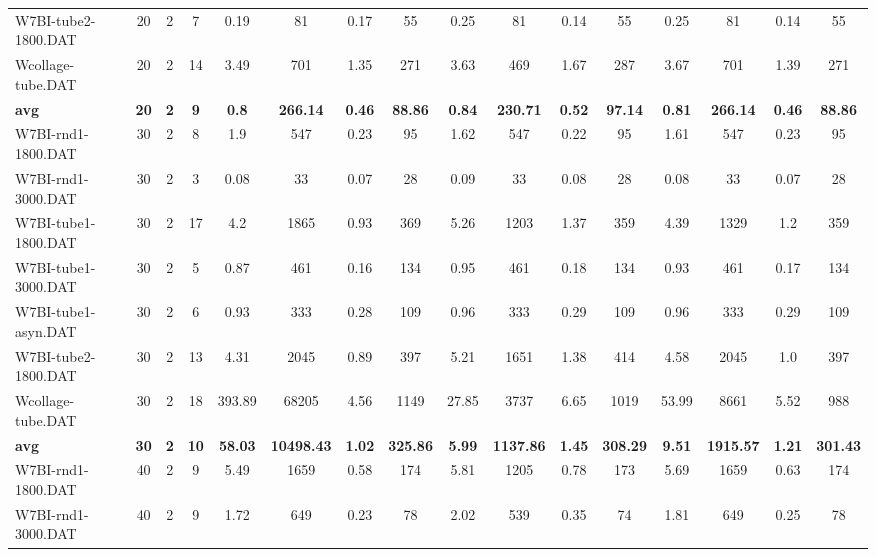 \begin{sidewaystable}[!ht]
{\begin{tabular}{lccccccccccccccc}
W7BI-tube2-1800.DAT & 20 & 2 & 7 & 0.19 & 81 & 0.17 & 55 & 0.25 & 81 &  \textcolor{blue2}{0.14} & 55 & 0.25 & 81 &  \textcolor{blue2}{0.14} & 55 \\
Wcollage-tube.DAT & 20 & 2 & 14 & 3.49 & 701 &  \textcolor{blue2}{1.35} & 271 & 3.63 & 469 & 1.67 & 287 & 3.67 & 701 & 1.39 & 271 \\
\cline{1-16} \textbf{avg} & \textbf{20} & \textbf{2} & \textbf{9} & \textbf{0.8} & \textbf{266.14} & \textbf{0.46} & \textbf{88.86} & \textbf{0.84} & \textbf{230.71} & \textbf{0.52} & \textbf{97.14} & \textbf{0.81} & \textbf{266.14} & \textbf{0.46} & \textbf{88.86} \\ \cline{1-16}
W7BI-rnd1-1800.DAT & 30 & 2 & 8 & 1.9 & 547 & 0.23 & 95 & 1.62 & 547 &  \textcolor{blue2}{0.22} & 95 & 1.61 & 547 & 0.23 & 95 \\
W7BI-rnd1-3000.DAT & 30 & 2 & 3 & 0.08 & 33 &  \textcolor{blue2}{0.07} & 28 & 0.09 & 33 & 0.08 & 28 & 0.08 & 33 &  \textcolor{blue2}{0.07} & 28 \\
W7BI-tube1-1800.DAT & 30 & 2 & 17 & 4.2 & 1865 &  \textcolor{blue2}{0.93} & 369 & 5.26 & 1203 & 1.37 & 359 & 4.39 & 1329 & 1.2 & 359 \\
W7BI-tube1-3000.DAT & 30 & 2 & 5 & 0.87 & 461 &  \textcolor{blue2}{0.16} & 134 & 0.95 & 461 & 0.18 & 134 & 0.93 & 461 & 0.17 & 134 \\
W7BI-tube1-asyn.DAT & 30 & 2 & 6 & 0.93 & 333 &  \textcolor{blue2}{0.28} & 109 & 0.96 & 333 & 0.29 & 109 & 0.96 & 333 & 0.29 & 109 \\
W7BI-tube2-1800.DAT & 30 & 2 & 13 & 4.31 & 2045 &  \textcolor{blue2}{0.89} & 397 & 5.21 & 1651 & 1.38 & 414 & 4.58 & 2045 & 1.0 & 397 \\
Wcollage-tube.DAT & 30 & 2 & 18 & 393.89 & 68205 &  \textcolor{blue2}{4.56} & 1149 & 27.85 & 3737 & 6.65 & 1019 & 53.99 & 8661 & 5.52 & 988 \\
\cline{1-16} \textbf{avg} & \textbf{30} & \textbf{2} & \textbf{10} & \textbf{58.03} & \textbf{10498.43} & \textbf{1.02} & \textbf{325.86} & \textbf{5.99} & \textbf{1137.86} & \textbf{1.45} & \textbf{308.29} & \textbf{9.51} & \textbf{1915.57} & \textbf{1.21} & \textbf{301.43} \\ \cline{1-16}
W7BI-rnd1-1800.DAT & 40 & 2 & 9 & 5.49 & 1659 &  \textcolor{blue2}{0.58} & 174 & 5.81 & 1205 & 0.78 & 173 & 5.69 & 1659 & 0.63 & 174 \\
W7BI-rnd1-3000.DAT & 40 & 2 & 9 & 1.72 & 649 &  \textcolor{blue2}{0.23} & 78 & 2.02 & 539 & 0.35 & 74 & 1.81 & 649 & 0.25 & 78 \\

\end{tabular}}
\end{sidewaystable}
